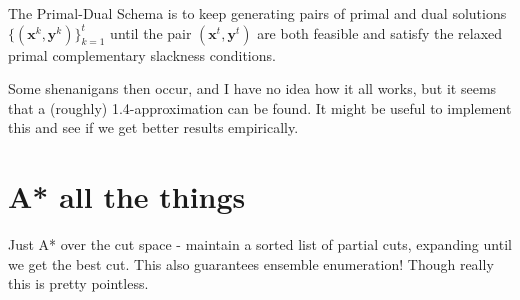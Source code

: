 \documentclass[11pt]{article}
\begin{document}
    The Primal-Dual Schema is to keep generating pairs of primal and dual solutions
   	$\{ ( \textbf{x}^k, \textbf{y}^k ) \}_{k=1}^{t} $ until the pair
   	$(\textbf{x}^t, \textbf{y}^t)$ are both feasible and satisfy the relaxed
   	primal complementary slackness conditions. 
    
    Some shenanigans then occur, and I have no idea how it all works, but it seems
    that a (roughly) 1.4-approximation can be found. It might be useful to 
    implement this and see if we get better results empirically. 
    	
	\section{A* all the things}
	
	Just A* over the cut space - maintain a sorted list of partial cuts, 
	expanding until we get the best cut. This also guarantees ensemble 
	enumeration! Though really this is pretty pointless.
\end{document}

